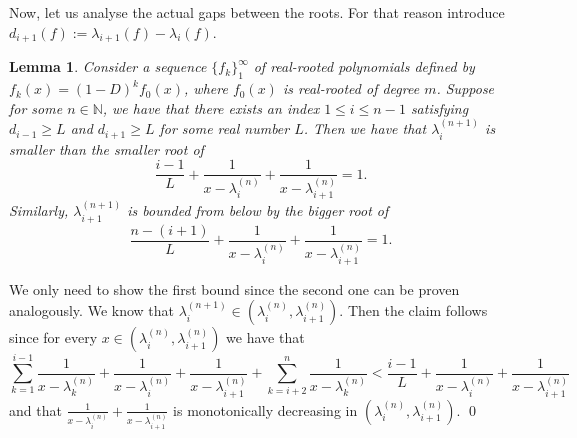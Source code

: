 \documentclass[11pt]{article}
\DeclareMathOperator{\AG}{AG}
\newtheorem{lemma}[theorem]{Lemma}
\begin{document}
\begin{comment}
\[|\lambda^{(n+1)}_3 - \lambda^{(n+1)}_2|\ge |\mu_2 - \mu_1| = \sqrt{|\lambda^{(n)}_3 - \lambda^{(n)}_2|^2 + \frac{4}{(1+\varepsilon)^2}} > \sqrt{|\lambda^{(n)}_3 - \lambda^{(n)}_2|^2 +4}.\]
Clearly, this implies that $|\lambda^{(N + k)}_3 - \lambda^{(N+k)}_2|$ is monotonically increasing sequence. Assuming it has a finite limit $l$, leads to $l > \sqrt{l^2 +4}$, which is absurd. Hence, $\lim_{n\to \infty} |\lambda^{(n)}_3 - \lambda^{(n)}_2|=\lim_{k\to \infty} |\lambda^{(N + k)}_3 - \lambda^{(N+k)}_2| = \infty,$ as claimed.

\textbf{2 case:}
Suppose now that for every $M$, there exist $m, k > M$ such that $\alpha_n > \beta_n$ and $\beta_k > \alpha_k$. Let $l$ be an index for "transition", i.e. $\alpha_l > \beta_l$ and $\beta_{l+1} > \alpha_{l+1}$ or vice versa. Without loss of generality, we are in the first situation. Recall that the $(1-D)$ operator moves $\lambda^{(l)}_{1}$ to the right by at most 1, $\lambda^{(l)}_{2}$ - by at most 2, and $\lambda^{(l)}_{3}$ - by at most 3. Therefore, $\alpha_{l+1} > \alpha_l - 1$ and $\beta_{l+1} < \beta_l + 3$. Combining these two inequalities with $\alpha_l > \beta_l$ and $\beta_{l+1} > \alpha_{l+1}$ leads to $\beta_l > \frac{\AG(f_l)}{2} - 2$. Since $l$ can be arbitrarily big, so can be $\AG(f_l)$. Due to Lemma~\ref{minimal gap increases}, this implies that the minimal gap between roots goes unbounded. In particular, $\lim \alpha_n = \lim \beta_n = \infty$.
\qed
\end{comment}

Now, let us analyse the actual gaps between the roots. For that reason introduce $d_{i+1}(f) := \lambda_{i+1}(f) - \lambda_i(f)$.

\begin{lemma}
\label{minimal gap shall approach}
 Consider a sequence $\{f_k\}_1^\infty$ of real-rooted polynomials defined by $f_k(x) = (1-D)^k f_0(x)$, where $f_0(x)$ is real-rooted of degree $m$. Suppose for some $n\in\mathbb{N}$, we have that there exists an index $1\leq i\leq n-1$ satisfying $d_{i-1} \geq L$ and $d_{i+1} \geq L$ for some real number $L$. Then we have that $\lambda^{(n+1)}_i$ is smaller than the smaller root of
 \[\frac{i-1}{L}+\frac{1}{x-\lambda^{(n)}_i} + \frac{1}{x-\lambda^{(n)}_{i+1}} = 1.\]
 Similarly, $\lambda^{(n+1)}_{i+1}$ is bounded from below by the bigger root of 
 \[\frac{n-(i+1)}{L}+\frac{1}{x-\lambda^{(n)}_i} + \frac{1}{x-\lambda^{(n)}_{i+1}} = 1.\]
\end{lemma}
\proof
We only need to show the first bound since the second one can be proven analogously. We know that $\lambda^{(n+1)}_i\in(\lambda^{(n)}_i,\lambda^{(n)}_{i+1})$. Then the claim follows since for every $x\in (\lambda^{(n)}_i,\lambda^{(n)}_{i+1})$ we have that
\[\sum^{i-1}_{k=1} \frac{1}{x-\lambda^{(n)}_k} + \frac{1}{x-\lambda^{(n)}_i} + \frac{1}{x-\lambda^{(n)}_{i+1}} + \sum^n_{k = i+2} \frac{1}{x-\lambda^{(n)}_k} < \frac{i-1}{L}+\frac{1}{x-\lambda^{(n)}_i} + \frac{1}{x-\lambda^{(n)}_{i+1}} \]
and that $\frac{1}{x-\lambda^{(n)}_i} + \frac{1}{x-\lambda^{(n)}_{i+1}}$ is monotonically decreasing in $(\lambda^{(n)}_i,\lambda^{(n)}_{i+1})$.
\qed
\end{document}
